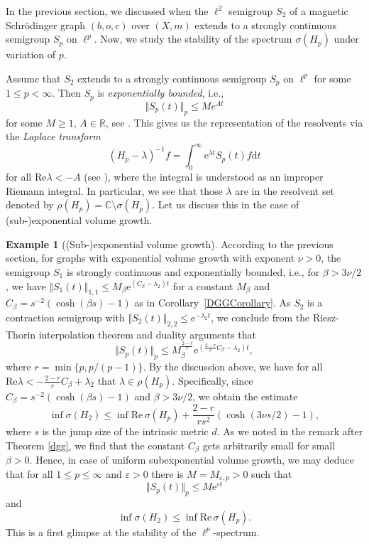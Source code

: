 \documentclass[10pt]{amsart}
\theoremstyle{definition}
\newtheorem{example}[theorem]{Example}
\begin{document}
In the previous section, we discussed when the $\ell^2$ semigroup $S_2$ of a magnetic Schrödinger graph $(b,o,c)$ over $(X,m)$ extends to a strongly continuous semigroup $S_p$ on $\ell^p.$  Now, we study the stability of the spectrum $\sigma( H_p)$ under variation of $p.$ 

Assume that $S_2$ extends to a strongly continuous semigroup $S_p$ on $\ell^p$ for some  $1\leq p<\infty$. Then $ S_{p} $ is \emph{exponentially bounded}, i.e., \[\Vert S_p(t)\Vert_p\leq M e^{A t}\] for some $M\geq 1$, $A\in\mathbb{R}$, see \cite[Proposition~1.4]{EngelNagelShort}. 
This gives us the representation of the resolvents via the \emph{Laplace transform}
\[( H_p-\lambda)^{-1}  f= \int_0^\infty\mathrm{e}^{\lambda t}S_p(t) f\mathrm{d}t\] for all $\mathrm{Re}\lambda<-A$ (see \cite[Theorem~1.10]{EngelNagelShort}), where the integral is understood as an improper Riemann integral. In particular, we see that those $\lambda$  are in the resolvent set denoted by $\rho( H_p)=\mathbb{C}\setminus \sigma(H_p).$ Let us discuss this in the case of (sub-)exponential volume growth. 

\begin{example}[(Sub-)exponential volume growth]\label{exampleexpvolgrowth}
 According to the previous section, for graphs with exponential volume growth with exponent $\nu>0$, the semigroup $S_1$ is strongly continuous and exponentially bounded, i.e., for $\beta>3\nu\slash 2$, we have  $\Vert S_1(t)\Vert_{1,1}\leq M_\beta\mathrm{e}^{(C_\beta -\lambda_{2})t}$  for a constant $M_\beta$ and $C_\beta= s^{-2}(\cosh(\beta s)-1)$ as in Corollary~\ref{DGGCorollary}.
  As $S_2$ is a contraction semigroup with $\Vert S_2(t)\Vert_{2,2}\leq \mathrm{e}^{-\lambda_{2}t}$, we conclude from the Riesz-Thorin interpolation theorem and duality arguments that \[\Vert S_p(t)\Vert_p\leq M_\beta^{\frac{2-r}{r}}\mathrm{e}^{\left(\frac{2-r}{r}C_\beta -\lambda_{2}\right) t},\] where $r = \min\lbrace p,p\slash(p-1)\rbrace.$
By the discussion above, we have for all $\mathrm{Re}\lambda<-\frac{2-r}{r}C_\beta +\lambda_{2}$ that $\lambda\in\rho( H_p).$ Specifically, since $C_\beta = s^{-2}(\cosh(\beta s)-1)$ and $\beta>3\nu/2$, we obtain the estimate
\[\inf\sigma( H_2)\leq \inf\mathrm{Re}\,\sigma( H_p) +\frac{2-r}{rs^{2}} (\cosh(3\nu s/2)-1),
 \]
 where $s$ is the jump size of the intrinsic metric $d.$
As we noted in the remark after Theorem \ref{dgg}, we find that the constant $C_\beta$ gets arbitrarily small for small $\beta >0.$ Hence, in case of uniform subexponential volume growth, we may deduce that for all $1\leq p\leq\infty$ and $\varepsilon >0$  there is $M=M_{\varepsilon,p}>0$ such that
\[\Vert S_p(t)\Vert_p\leq M \mathrm{e}^{\varepsilon t}\]
and 
\[\inf\sigma( H_2)\leq \inf\mathrm{Re}\,\sigma( H_p).\] 
This is a first glimpse at the stability of the $\ell^p$-spectrum.
\end{example}
\end{document}
